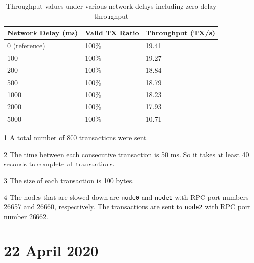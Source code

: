 \documentclass{article}
\begin{document}
\begin{table}[ht]
    \begin{threeparttable}
        \caption{Throughput values under various network delays including zero delay throughput}
        \centering
        \begin{tabular}{|l|l|l|}
            \hline
            \textbf{Network Delay (ms)} & \textbf{Valid TX Ratio} & \textbf{Throughput (TX/s)} \\ \hline
            0 (reference)               & 100\%                   & 19.41                       \\ \hline
            100                         & 100\%                   & 19.27                       \\ \hline
            200                         & 100\%                   & 18.84                       \\ \hline
            500                         & 100\%                   & 18.79                       \\ \hline
            1000                        & 100\%                   & 18.23                       \\ \hline
            2000                        & 100\%                   & 17.93                       \\ \hline
            5000                        & 100\%                   & 10.71                       \\ \hline
        \end{tabular}
        \label{tab:Network delay throughput two nodes slowed down, test on not slowed down node}
        \begin{tablenotes}
            \item[1] A total number of 800 transactions were sent.
            \item[2] The time between each consecutive transaction is 50 ms. So it takes at least 40 seconds to complete all transactions.
            \item[3] The size of each transaction is 100 bytes.
            \item[4] The nodes that are slowed down are \texttt{node0} and \texttt{node1} with RPC port numbers 26657 and 26660, respectively. The transactions are sent to \texttt{node2} with RPC port number 26662.
        \end{tablenotes}
    \end{threeparttable}
\end{table}

\section*{22 April 2020}
\end{document}

